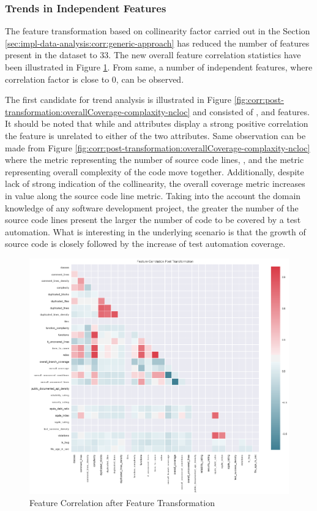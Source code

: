 \subsubsection{Trends in Independent Features}\label{sec:impl-data-analysis:independent-features}
The feature transformation based on collinearity factor carried out in the Section \ref{sec:impl-data-analysis:corr:generic-approach} has reduced the number of features present in the dataset to 33. The new overall feature correlation statistics have been illustrated in Figure \ref{fig:corr:post-transformation}. From same, a number of independent features, where correlation factor is close to 0, can be observed.

The first candidate for trend analysis is illustrated in Figure \ref{fig:corr:post-transformation:overallCoverage-complaxity-ncloc} and consisted of \overallCoverage{}, \complexity{} and\ncloc{} features. It should be noted that while \ncloc{} and \complexity{} attributes display a strong positive correlation the \overallCoverage{} feature is unrelated to either of the two attributes. Same observation can be made from Figure \ref{fig:corr:post-transformation:overallCoverage-complaxity-ncloc} where the metric representing the number of source code lines, \ncloc{}, and the metric representing overall complexity of the code move together. Additionally, despite lack of strong indication of the collinearity, the overall coverage metric increases in value along the source code line metric. Taking into the account the domain knowledge of any software development project, the greater the number of the source code lines present the larger the number of code to be covered by a test automation. What is interesting in the underlying scenario is that the growth of source code is closely followed by the increase of test automation coverage. 

\begin{figure}[!h]
    \centering
    \includegraphics[scale=0.5]{Figures/correlation/Feature_Correlation_Post_Transformation.png}
    \caption{Feature Correlation after Feature Transformation}
    \label{fig:corr:post-transformation}
\end{figure}

